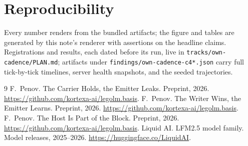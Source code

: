 \documentclass[11pt]{article}
\begin{document}
\section{Reproducibility}

Every number renders from the bundled artifacts; the figure and tables
are generated by this note's renderer with assertions on the headline
claims. Registrations and results, each dated before its run, live in
\texttt{tracks/own-cadence/PLAN.md}; artifacts under
\texttt{findings/own-cadence-c4*.json} carry full tick-by-tick
timelines, server health snapshots, and the seeded trajectories.\par

\begin{thebibliography}{9}
 F.~Penov. The Carrier Holds, the Emitter
Leaks. Preprint, 2026.
\url{https://github.com/kortexa-ai/legolm.basis}.
 F.~Penov. The Writer Wins, the Emitter
Learns. Preprint, 2026.
\url{https://github.com/kortexa-ai/legolm.basis}.
 F.~Penov. The Host Is Part of the Block.
Preprint, 2026. \url{https://github.com/kortexa-ai/legolm.basis}.
 Liquid AI. LFM2.5 model family. Model releases,
2025--2026. \url{https://huggingface.co/LiquidAI}.
\end{thebibliography}
\end{document}
